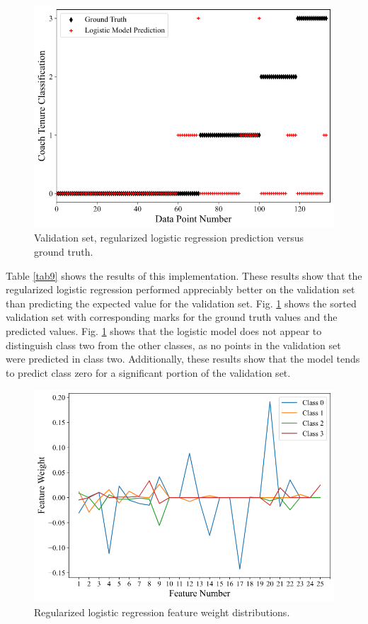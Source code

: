 \documentclass[conference]{IEEEtran}
\begin{document}
\begin{figure}[htbp]
\centerline{\includegraphics[width=1\linewidth]{test4.png}}
\caption{Validation set, regularized logistic regression prediction versus ground truth.}
\label{fig10}
\end{figure}

Table \ref{tab9} shows the results of this implementation. These results show that the regularized logistic regression performed  appreciably better on the validation set than predicting the expected value for the validation set. Fig. \ref{fig10} shows the sorted validation set with corresponding marks for the ground truth values and the predicted values. Fig. \ref{fig10} shows that the logistic model does not appear to distinguish class two from the other classes, as no points in the validation set were predicted in class two. Additionally, these results show that the model tends to predict class zero for a significant portion of the validation set. 

\begin{figure}[htbp]
\centerline{\includegraphics[width=1\linewidth]{weight4.png}}
\caption{Regularized logistic regression feature weight distributions.}
\label{fig11}
\end{figure}
\end{document}

